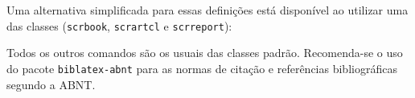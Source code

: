 \documentclass{ltxdoc}
\begin{document}
Uma alternativa simplificada para essas definições está disponível ao utilizar uma das classes  (\texttt{scrbook}, \texttt{scrartcl} e \texttt{scrreport}):

\begin{codigo}{}

\BeforeStartingTOC[loe]{\def\autodot{\hfill~--~\hfill}}
\end{codigo}


Todos os outros comandos são os usuais das classes padrão. Recomenda-se o uso do pacote \texttt{biblatex-abnt} para as normas de citação e referências bibliográficas segundo a ABNT. 
\end{document}
